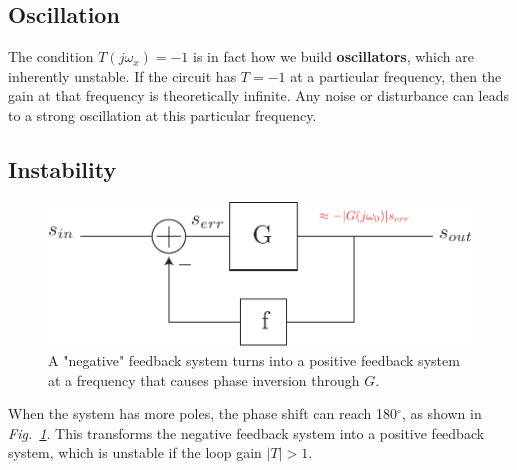 \subsection{Oscillation}
The condition $T(j\omega_x) = -1$ is in fact how we build \textbf{oscillators}, which are inherently unstable. If the circuit has $T = -1$ at a particular frequency, then the gain at that frequency is theoretically infinite.  Any noise or disturbance can leads to a strong oscillation at this particular frequency.
\newpage
\subsection{Instability}
\begin{figure}[tb]
\centering
\includegraphics[scale=.7]{fbblock_phase}
\caption{A "negative" feedback system turns into a positive feedback system at a frequency that causes phase inversion through $G$.}
\label{fig:fbblock_phase}
\end{figure}
When the system has more poles, the phase shift can reach 180$^\circ$, as shown in \emph{Fig.~\ref{fig:fbblock_phase}}. 
This transforms the negative feedback system into a positive feedback system, which is unstable if the loop gain $|T|>1$.  


